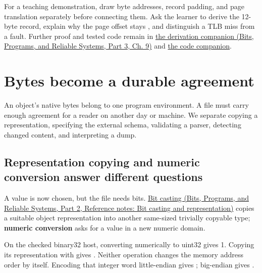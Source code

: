 For a teaching demonstration, draw byte addresses, record padding, and page translation separately before connecting them. Ask the learner to derive the 12-byte record, explain why the page offset stays , and distinguish a TLB miss from a fault. Further proof and tested code remain in \href{../01-Bits-Programs-and-Reliable-Systems-P03/main.pdf\#01-foundations-i-ch011-m003---byte-order-layout-and-translation}{the derivation companion (Bits, Programs, and Reliable Systems, Part 3, Ch. 9)} and \hyperref[appendix-4e2236f53445-m003---explicit-byte-codecs-and-checked-alignment]{the code companion}.

\section{Bytes become a durable agreement}\label{05-engine-i-ch002-bytes-become-a-durable-agreement}

\hypertarget{05-engine-i-ch002-bytes-become-a-durable-agreement}{}

An object's native bytes belong to one program environment. A file must carry enough agreement for a reader on another day or machine. We separate copying a representation, specifying the external schema, validating a parser, detecting changed content, and interpreting a dump.

\subsection{Representation copying and numeric conversion answer different questions}\label{05-engine-i-ch002-representation-copying-and-numeric-conversion-answer-different-questions}

\hypertarget{05-engine-i-ch002-representation-copying-and-numeric-conversion-answer-different-questions}{}

A value is now chosen, but the file needs bits. \href{../01-Bits-Programs-and-Reliable-Systems-P02/main.pdf\#appendix-34ee45f161c1}{Bit casting (Bits, Programs, and Reliable Systems, Part 2, Reference notes: Bit casting and representation)} copies a suitable object representation into another same-sized trivially copyable type; \textbf{numeric conversion} asks for a value in a new numeric domain.

On the checked binary32 host, converting  numerically to uint32 gives 1. Copying its representation with  gives . Neither operation changes the memory address order by itself. Encoding that integer word little-endian gives ; big-endian gives .

